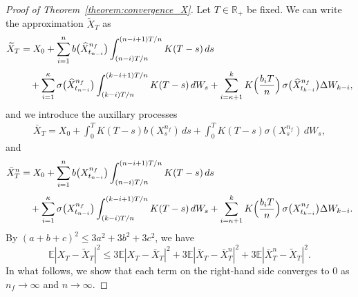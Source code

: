 \documentclass[11pt]{article}%
\theoremstyle{definition}
\begin{document}
\begin{proof}[Proof of Theorem~\ref{theorem:convergence_X}]
    Let \(T\in \mathbb{R}_+\) be fixed. We can write the approximation \(\widetilde{X}_T\) as 
    \begin{align*}
        \widetilde{X}_T &= X_0 + \sum_{i=1}^{n} b\bigl(\widehat{X}_{t_{n-i}}^{n_f}\bigr) \int_{(n-i)T/n}^{(n-i+1)T/n} K(T-s)\,ds \nonumber\\[1mm]
        &\quad + \sum_{i=1}^{\kappa} \sigma\bigl(\widehat{X}_{t_{n-i}}^{n_f}\bigr)
        \int_{(k-i)T/n}^{(k-i+1)T/n} K(T-s)\,dW_s
        + \sum_{i=\kappa+1}^{k} K\Bigl(\frac{b_{i}T}{n}\Bigr)\, \sigma\bigl(\widehat{X}_{t_{k-i}}^{n_f}\bigr) \Delta W_{k-i},
    \end{align*}
    and we introduce the auxillary processes 
    \begin{align*}
        \bar{X}_T = X_0 + \int_{0}^{T} K(T-s) b(X_s^{n_f})\,ds + \int_{0}^{T} K(T-s) \sigma(X_s^{n_f})\,dW_s,
    \end{align*}
    and 
    \begin{align*}
        \bar{X}_T^n &= X_0 + \sum_{i=1}^{n} b\bigl(X_{t_{n-i}}^{n_f}\bigr) \int_{(n-i)T/n}^{(n-i+1)T/n} K(T-s)\,ds \nonumber\\[1mm]
        &\quad + \sum_{i=1}^{\kappa} \sigma\bigl(X_{t_{n-i}}^{n_f}\bigr)
        \int_{(k-i)T/n}^{(k-i+1)T/n} K(T-s)\,dW_s
        + \sum_{i=\kappa+1}^{k} K\Bigl(\frac{b_{i}T}{n}\Bigr)\, \sigma\bigl(X_{t_{k-i}}^{n_f}\bigr) \Delta W_{k-i}.
    \end{align*}
    By \((a+b+c)^2 \le 3a^2+3b^2+3c^2\), we have 
    \[
        \mathbb{E} |X_T - \widetilde{X}_T|^2 \le 3\mathbb{E} |X_T - \bar{X}_T|^2 + 3\mathbb{E} |\bar{X}_T - \bar{X}_T^n|^2 + 3\mathbb{E} |\bar{X}_T^n - \widetilde{X}_T|^2.
    \]
    In what follows, we show that each term on the right-hand side converges to $0$ as \(n_f\to \infty\) and \(n\to \infty\).


\end{proof}
\end{document}
